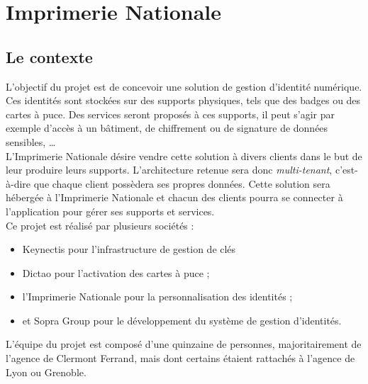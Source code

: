 \cleardoublepage

\chapter{Imprimerie Nationale}


\section{Le contexte}

L'objectif du projet est de concevoir une solution de gestion d'identité numérique.
Ces identités sont stockées sur des supports physiques, tels que des badges ou des cartes à puce.
Des services seront proposés à ces supports, il peut s'agir par exemple d'accès à un bâtiment, de chiffrement ou de signature de données sensibles, \ldots
\\

L'Imprimerie Nationale désire vendre cette solution à divers clients dans le but de leur produire leurs supports.
L'architecture retenue sera donc \textit{multi-tenant}, c'est-à-dire que chaque client possèdera ses propres données.
Cette solution sera hébergée à l'Imprimerie Nationale et chacun des clients pourra se connecter à l'application pour gérer ses supports et services.
\\

Ce projet est réalisé par plusieurs sociétés :
\begin{itemize}
	\item Keynectis pour l'infrastructure de gestion de clés
	\item Dictao pour l'activation des cartes à puce ;
	\item l'Imprimerie Nationale pour la personnalisation des identités ;
	\item et Sopra Group pour le développement du système de gestion d'identités.
\end{itemize}
L'équipe du projet est composé d'une quinzaine de personnes, majoritairement de l'agence de Clermont Ferrand, mais dont certains étaient rattachés à l'agence de Lyon ou Grenoble.

